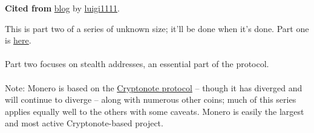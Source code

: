 \textbf{Cited from} \href{https://steemit.com/monero/@luigi1111/understanding-monero-cryptography-privacy-part-2-stealth-addresses}{blog} by \href{https://github.com/luigi1111}{luigi1111}.\par
\begin{displayquote}
This is part two of a series of unknown size; it'll be done when it's done. Part one is \href{https://steemit.com/monero/@luigi1111/understanding-monero-cryptography-privacy-introduction}{here}.\\\\
Part two focuses on stealth addresses, an essential part of the protocol.\\\\
Note: Monero is based on the \href{https://cryptonote.org/whitepaper.pdf}{Cryptonote protocol} -- though it has diverged and will continue to diverge -- along with numerous other coins; much of this series applies equally well to the others with some caveats. Monero is easily the largest and most active Cryptonote-based project.
\end{displayquote}

